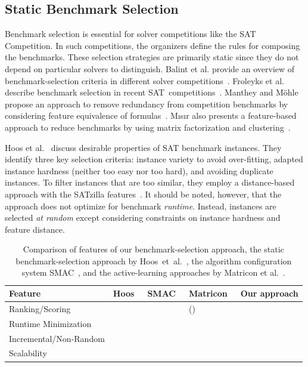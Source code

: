 \documentclass[sn-basic, Numbered]{sn-jnl} %
\newcommand{\cmark}{\ding{51}} %
\newcommand{\xmark}{\ding{55}}
\begin{document}
\subsection{Static Benchmark Selection}
\label{sec:related:static-selection}

Benchmark selection is essential for solver competitions like the SAT Competition.
In such competitions, the organizers define the rules for composing the benchmarks.
These selection strategies are primarily static since they do not depend on particular solvers to distinguish.
Balint et al. provide an overview of benchmark-selection criteria in different solver competitions~\cite{balint2015overview}.
Froleyks et al. describe benchmark selection in recent SAT~competitions~\cite{FroleyksHIJS21}.
Manthey and Möhle propose an approach to remove redundancy from competition benchmarks by considering feature equivalence of formulas~\cite{manthey2016better}.
M{\i}s{\i}r also presents a feature-based approach to reduce benchmarks by using matrix factorization and clustering~\cite{misir2021benchmark}.

Hoos et al.~\cite{HoosKSS13} discuss desirable properties of SAT benchmark instances.
They identify three key selection criteria: instance variety to avoid over-fitting, adapted instance hardness (neither too easy nor too hard), and avoiding duplicate instances. 
To filter instances that are too similar, they employ a distance-based approach with the SATzilla features~\cite{XuHHL08,features}.
It should be noted, however, that the approach does not optimize for benchmark \emph{runtime}.
Instead, instances are selected \emph{at random} except considering constraints on instance hardness and feature distance.

\begin{table}[tbp]
  \centering
  \caption{Comparison of features of our benchmark-selection approach, the static benchmark-selection approach by Hoos~et~al.~\cite{HoosKSS13}, the algorithm configuration system SMAC~\cite{HutterHL11}, and the active-learning approaches by Matricon et al.~\cite{MatriconAFSH21}.
  }
  \label{tab:requirements}
  \begin{tabular}{
    m{}
    >{\centering\arraybackslash}m{}
    >{\centering\arraybackslash}m{}
    >{\centering\arraybackslash}m{}
    >{\centering\arraybackslash}m{}
  }
    \toprule
    Feature & Hoos~\cite{HoosKSS13} & SMAC~\cite{HutterHL11} & Matricon~\cite{MatriconAFSH21} & Our approach \\
    \midrule
    Ranking/Scoring & \cmark & \xmark & (\cmark) & \cmark \\
    Runtime Minimization & \xmark & \cmark & \cmark & \cmark \\
    Incremental/Non-Random & \xmark & \xmark & \cmark & \cmark \\
    Scalability & \cmark & \cmark & \xmark & \cmark \\
    \bottomrule
  \end{tabular}
\end{table}
\end{document}

